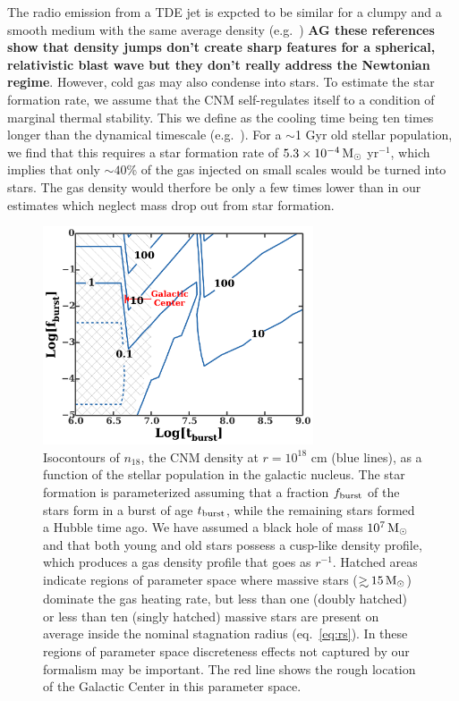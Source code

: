 \documentclass[usenatbib,fleqn]{mnras}
\newcommand\gsim{\mathrel{\rlap{\lower4pt\hbox{\hskip1pt$\sim$}}
    \raise1pt\hbox{$>$}}}
\newcommand{\Msun}{{\rm M_\odot}}
\begin{document}
The radio emission from a TDE jet is expcted to be similar for a
clumpy and a smooth medium with the same average density
(e.g.~\citealt{Nakar&Granot2007,van-Eerten+2009,Mimica&Giannios2011})
{\bf AG these references show that density jumps don't create sharp
  features for a spherical, relativistic blast wave but they don't
  really address the Newtonian regime}.  However, cold gas may also
condense into stars.  To estimate the star formation rate, we assume
that the CNM self-regulates itself to a condition of marginal thermal
stability.  This we define as the cooling time being ten times longer
than the dynamical timescale (e.g.~\citealt{McCourt+09}). For a
$\sim$1 Gyr old stellar population, we find that this requires a star
formation rate of $5.3 \times 10^{-4} \,\Msun$ yr$^{-1}$, which
implies that only $\sim 40$\% of the gas injected on small scales
would be turned into stars.  The gas density would therfore be only a
few times lower than in our estimates which neglect mass drop out from
star formation.

\begin{figure} 
  \includegraphics[width=8cm]{cnm_plot.pdf}
  \caption{\label{fig:param} Isocontours of $n_{18}$, the CNM density
    at $r = 10^{18}$ cm (blue lines), as a function of the stellar
    population in the galactic nucleus.  The star formation is
    parameterized assuming that a fraction $f_{\rm burst}$ of the
    stars form in a burst of age $t_{\rm burst}$, while the remaining
    stars formed a Hubble time ago.  We have assumed a black hole of
    mass $10^{7} \, \Msun$ and that both young and old stars possess a
    cusp-like density profile, which produces a gas density profile
    that goes as $r^{-1}$.  Hatched areas indicate regions of
    parameter space where massive stars ($\gsim 15 \, \Msun$) dominate
    the gas heating rate, but less than one (doubly hatched) or less
    than ten (singly hatched) massive stars are present on average
    inside the nominal stagnation radius (eq.~\ref{eq:rs}).  In these
    regions of parameter space discreteness effects not captured by
    our formalism may be important. The red line shows the rough location of
    the Galactic Center in this parameter space.}
\end{figure}
\end{document}
